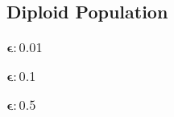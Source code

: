 % 
% 
% 
\subsection{Diploid Population}
\subsubsection{$\bm{\epsilon: 0.01}$}

\subsubsection{$\bm{\epsilon: 0.1}$}

\subsubsection{$\bm{\epsilon: 0.5}$}


